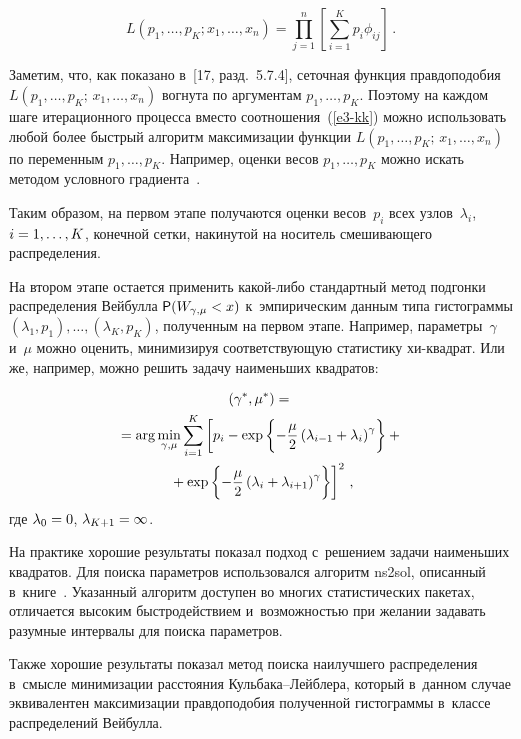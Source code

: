 \begin{multicols}{2}
\noindent
$$
L\left(p_1,\ldots,p_K;x_1,\ldots,x_n\right)=\prod\limits_{j=1}^n\left[
\sum\limits_{i=1}^K
p_i\phi_{ij}\right]\,.
$$


Заметим, что, как показано в~[17, разд.~5.7.4],
сеточная функция правдоподобия $L(p_1,\ldots,p_{K};\,x_1,\ldots,x_n)$
вогнута по аргументам $p_1,\ldots,p_{K}$. Поэтому на каждом шаге
итерационного процесса вместо соотношения~(\ref{e3-kk}) можно использовать
любой более быстрый алгоритм максимизации функции
$L(p_1,\ldots,p_{K};\,x_1,\ldots,x_n)$ по переменным $p_1,\ldots,p_{K}$.
Например, оценки весов $p_1,\ldots,p_K$ можно искать методом условного
градиента~\cite{Korolev2011, KorolevNazarov2010}.

\smallskip

Таким образом, на первом этапе получаются оценки весов~$p_i$ всех
узлов~$\lambda_i$, $i\hm=1,\ldots,K$, конечной сетки, накинутой на
носитель смешивающего распределения.

На втором этапе остается применить ка\-кой-ли\-бо стандартный метод
подгонки распределения Вейбулла ${\sf P}(W_{\gamma,\mu}\hm<x)$ 
к~эмпирическим данным типа гистограммы $(\lambda_1, p_1),\ldots,
(\lambda_K, p_K)$, полученным на первом этапе. Например, параметры~$\gamma$ 
и~$\mu$ можно оценить, минимизируя соответствующую
статистику хи-квад\-рат. Или же, например, можно решить задачу
наименьших квадратов:

\vspace*{-2pt}

\noindent
\begin{multline*}
(\gamma^*,\mu^*)={}\\
{}=\arg\min_{\gamma,\mu}\sum_{i=1}^K\left[p_i-
\exp\left\{-\displaystyle\frac{\displaystyle \mu\mathstrut}{\displaystyle 2\mathstrut}\left(\lambda_{i-1}+\lambda_i\right)^{\gamma}\right\}+{}\right.\\
\left.{}+
\exp\left\{-\displaystyle\frac{\displaystyle \mu\mathstrut}{\displaystyle 2\mathstrut}\left(\lambda_i+\lambda_{i+1}\right)^{\gamma}\right\}\right]^2\,,
\end{multline*}
где $\lambda_0\hm=0$, $\lambda_{K+1}\hm=\infty$.

\pagebreak

На практике хорошие результаты показал подход с~решением задачи
наименьших квадратов. Для поиска параметров использовался алгоритм
{\sf ns2sol}, описанный в~книге~\cite{DSch1983}. Указанный алгоритм
доступен во многих статистических пакетах, отличается высоким
быстродействием и~возможностью при желании задавать разумные
интервалы для поиска параметров.

Также хорошие результаты показал метод поиска наилучшего
распределения в~смысле минимизации расстояния Куль\-ба\-ка--Лейб\-ле\-ра,
который в~данном случае эквивалентен максимизации правдоподобия
полученной гистограммы в~классе распределений Вейбулла.


\end{multicols}
